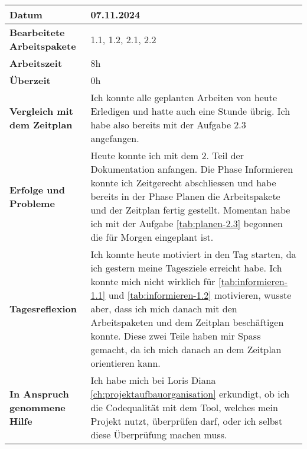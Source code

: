 \begin{longtable}{p{}|p{}}
	\hline
	\textbf{Datum}                       & 07.11.2024            \\
	\hline
	\textbf{Bearbeitete Arbeitspakete}   & 1.1, 1.2, 2.1, 2.2                  \\
	\hline
	\textbf{Arbeitszeit}                 & 8h                                    \\
	\hline
	\textbf{Überzeit}                    & 0h                                    \\
	\hline
	\textbf{Vergleich mit dem Zeitplan}  & Ich konnte alle geplanten Arbeiten von heute Erledigen und hatte auch eine Stunde übrig. Ich habe also bereits mit der Aufgabe 2.3 angefangen. \\
	\hline
	\textbf{Erfolge und Probleme} & Heute konnte ich mit dem 2. Teil der Dokumentation anfangen. Die Phase Informieren konnte ich Zeitgerecht abschliessen und habe bereits in der Phase Planen die Arbeitspakete und der Zeitplan fertig gestellt. Momentan habe ich mit der Aufgabe \ref{tab:planen-2.3} begonnen die für Morgen eingeplant ist.
	\\
	\hline
	\textbf{Tagesreflexion} & Ich konnte heute motiviert in den Tag starten, da ich gestern meine Tagesziele erreicht habe. Ich konnte mich nicht wirklich für \ref{tab:informieren-1.1} und \ref{tab:informieren-1.2} motivieren, wusste aber, dass ich mich danach mit den Arbeitspaketen und dem Zeitplan beschäftigen konnte. Diese zwei Teile haben mir Spass gemacht, da ich mich danach an dem Zeitplan orientieren kann.
	\\
	\hline
	\textbf{In Anspruch genommene Hilfe} & Ich habe mich bei Loris Diana \ref{ch:projektaufbauorganisation} erkundigt, ob ich die Codequalität mit dem Tool, welches mein Projekt nutzt, überprüfen darf, oder ich selbst diese Überprüfung machen muss.                              \\
	\hline
\end{longtable}\label{tab:arbeitsprotokoll-07.11.2024}
\newpage

